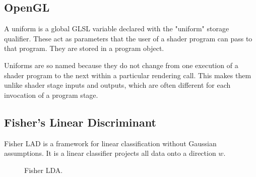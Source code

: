 \subsection{OpenGL}
A uniform is a global GLSL variable declared with the "uniform" storage qualifier. These act as parameters that the user of a shader program can pass to that program. They are stored in a program object. 

Uniforms are so named because they do not change from one execution of a shader program to the next within a particular rendering call. This makes them unlike shader stage inputs and outputs, which are often different for each invocation of a program stage.


\subsection{Fisher's Linear Discriminant}
 Fisher LAD is a framework for linear classification without Gaussian assumptions. It is a linear classifier projects all data onto a direction $w$.

\begin{figure}[h]
	\caption{Fisher LDA.}
\end{figure}























